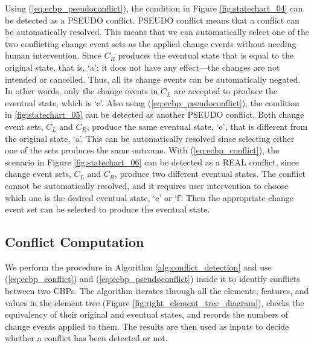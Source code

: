 Using (\ref{eq:ecbp_pseudoconflict}), the condition in Figure \ref{fig:statechart_04} can be detected as a \textsf{PSEUDO} conflict. \textsf{PSEUDO} conflict means that a conflict can be automatically resolved. This means that we can automatically select one of the two conflicting change event sets as the applied change events without needing human intervention. Since $C_{R}$ produces the eventual state that is equal to the original state, that is, ‘a’; it does not have any effect—the changes are not intended or cancelled. Thus, all its change events can be automatically negated. In other words, only the change events in $C_{L}$ are accepted to produce the eventual state, which is ‘e’. Also using (\ref{eq:ecbp_pseudoconflict}), the condition in \ref{fig:statechart_05} can be detected as another \textsf{PSEUDO} conflict. Both change event sets, $C_{L}$ and $C_{R}$, produce the same eventual state, ‘e’, that is different from the original state, ‘a’. This can be automatically resolved since selecting either one of the sets produces the same outcome. With (\ref{eq:ecbp_conflict}), the scenario in Figure \ref{fig:statechart_06} can be detected as a \textsf{REAL} conflict, since change event sets, $C_{L}$ and $C_{R}$, produce two different eventual states. The conflict cannot be automatically resolved, and it requires user intervention to choose which one is the desired eventual state, ‘e’ or ‘f’. Then the appropriate change event set can be selected to produce the eventual state.

\subsection{Conflict Computation}
\label{sec:conflict_computation}
We perform the procedure in Algorithm \ref{alg:conflict_detection} and use (\ref{eq:ecbp_conflict}) and (\ref{eq:ecbp_pseudoconflict}) inside it to identify conflicts between two CBPs. The algorithm iterates through all the elements, features, and values in the element tree (Figure \ref{fig:right_element_tree_diagram}), checks the equivalency of their original and eventual states, and records the numbers of change events applied to them. The results are then used as inputs to decide whether a conflict has been detected or not.

